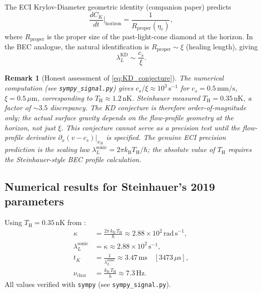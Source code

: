 \documentclass[12pt,a4paper]{article}
\newtheorem{remark}{Remark}
\renewcommand{\TH}{T_{\mathrm{H}}}
\newcommand{\lambdaL}{\lambda_L^{\mathrm{sonic}}}
\newcommand{\kB}{k_{\mathrm{B}}}
\begin{document}
The ECI Krylov-Diameter geometric identity (companion paper) predicts
\begin{equation}
  \frac{dC_K}{dt}\Biggl|_{\mathrm{horizon}}
    = \frac{1}{R_{\mathrm{proper}}(\eta_c)},
\end{equation}
where $R_{\mathrm{proper}}$ is the proper size of the past-light-cone
diamond at the horizon.
In the BEC analogue, the natural identification is
$R_{\mathrm{proper}} \sim \xi$ (healing length), giving
\begin{equation}
  \lambda_L^{\mathrm{KD}} \sim \frac{c_s}{\xi}.
  \label{eq:KD_conjecture}
\end{equation}

\begin{remark}[Honest assessment of \eqref{eq:KD_conjecture}]
The numerical computation (see \texttt{sympy\_signal.py}) gives
$c_s/\xi \approx 10^3\,\mathrm{s}^{-1}$ for $c_s = 0.5\,\mathrm{mm/s}$,
$\xi = 0.5\,\mu\mathrm{m}$, corresponding to $\TH \approx 1.2\,\mathrm{nK}$.
Steinhauer measured $\TH = 0.35\,\mathrm{nK}$, a factor of $\sim 3.5$
discrepancy.
The KD conjecture is therefore order-of-magnitude only; the actual surface
gravity depends on the flow-profile geometry at the horizon, not just $\xi$.
This conjecture \emph{cannot} serve as a precision test until the
flow-profile derivative $\partial_x(v - c_s)|_{x_H}$ is specified.
The genuine ECI precision prediction is the \emph{scaling law}
$\lambdaL = 2\pi\kB\TH/\hbar$; the absolute value of $\TH$ requires the
Steinhauer-style BEC profile calculation.
\end{remark}

\subsection{Numerical results for Steinhauer's 2019 parameters}

Using $\TH = 0.35\,\mathrm{nK}$ from \cite{steinhauer2019}:
\begin{align}
  \kappa &= \frac{2\pi\,\kB\,\TH}{\hbar}
    \approx 2.88 \times 10^2\,\mathrm{rad\,s}^{-1},\\
  \lambdaL &= \kappa \approx 2.88 \times 10^2\,\mathrm{s}^{-1},\\
  t_K &= \frac{1}{\lambdaL} \approx 3.47\,\mathrm{ms}
    \quad [3473\,\mu\mathrm{s}],\\
  \nu_{\mathrm{char}} &= \frac{\kB\,\TH}{h} \approx 7.3\,\mathrm{Hz}.
\end{align}
All values verified with \texttt{sympy} (see \texttt{sympy\_signal.py}).
\end{document}
